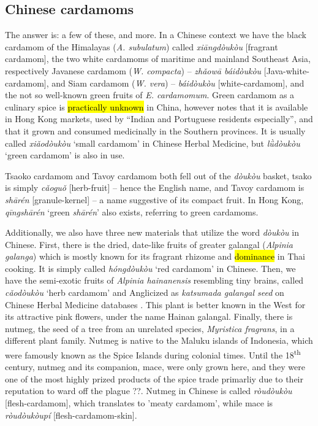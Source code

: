 \documentclass[12pt]{article}
\newcommand{\tc}[1]{\traditionalchinesefont{#1}\rmfamily}
\begin{document}

\subsection{Chinese cardamoms}

The answer is: a few of these, and more. In a Chinese context we have the black cardamom of the Himalayas (\textit{A. subulatum}) called \textit{xiāngdòukòu} [fragrant cardamom], the two white cardamoms of maritime and mainland Southeast Asia, respectively Javanese cardamom (\textit{W. compacta}) -- \textit{zhǎowā
báidòukòu} [Java-white-cardamom], and Siam cardamom (\textit{W. vera}) -- \textit{báidòukòu} [white-cardamom], and the not so well-known green fruits of \textit{E. cardamomum}. Green cardamom as a culinary spice is \hl{practically unknown} in China, however \textcite{hu_2005_food} notes that it is available in Hong Kong markets, used by ``Indian and Portuguese residents especially'', and that it grown and consumed medicinally in the Southern provinces. It is usually called \textit{xiǎodòukòu} `small cardamom' in Chinese Herbal Medicine, but \textit{lǜdòukòu} `green cardamom' is also in use.

Tsaoko cardamom and Tavoy cardamom both fell out of the \textit{dòukòu} basket, tsako is simply \textit{cǎoguǒ} [herb-fruit] -- hence the English name, and Tavoy cardamom is \textit{shārén} [granule-kernel] -- a name suggestive of its compact fruit. In Hong Kong, \tc{青砂仁} \textit{qīngshā​rén} `green \textit{shārén}' also exists, referring to green cardamoms.


Additionally, we also have three new materials that utilize the word \textit{dòukòu} in Chinese. First, there is the dried, date-like fruits of greater galangal (\textit{Alpinia galanga}) which is mostly known for its fragrant rhizome and \hl{dominance} in Thai cooking. It is simply called \textit{hóngdòukòu} `red cardamom' in Chinese. Then, we have the semi-exotic fruits of \textit{Alpinia hainanensis} resembling tiny brains, called \textit{cǎodòukòu} `herb cardamom' and Anglicized as \textit{katsumada galangal seed} on Chinese Herbal Medicine databases \parencite[cf.][]{polyu_2022_chinese}. This plant is better known in the West for its attractive pink flowers, under the name Hainan galangal. Finally, there is nutmeg, the seed of a tree from an unrelated species, \textit{Myristica fragrans}, in a different plant family. Nutmeg is native to the Maluku islands of Indonesia, which were famously known as the Spice Islands during colonial times. Until the 18\textsuperscript{th} century, nutmeg and its companion, mace, were only grown here, and they were one of the most highly prized products of the spice trade primarliy due to their reputation to ward off the plague ??.
Nutmeg in Chinese is called \textit{ròudòukòu} [flesh-cardamom], which translates to 'meaty cardamom', while mace is \textit{ròudòukòupí}	[flesh-cardamom-skin].
\end{document}
